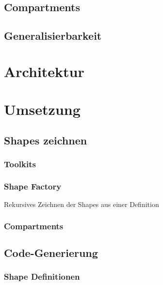 \subsection{Compartments}

\subsection{Generalisierbarkeit}


\section{Architektur}


\section{Umsetzung}


\subsection{Shapes zeichnen}

\subsubsection{Toolkits}

\subsubsection{\dd}

\citep{dd}

\subsubsection{Shape Factory}

Rekursives Zeichnen der Shapes aus einer Definition

\subsubsection{Compartments}


\subsection{Code-Generierung}

\subsubsection{Shape Definitionen}


